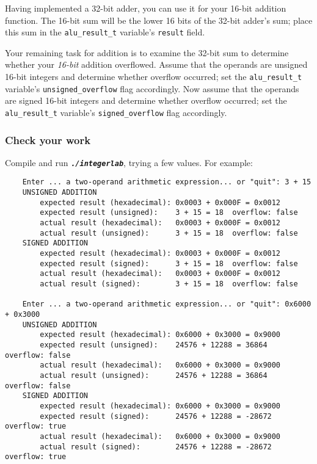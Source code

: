 Having implemented a 32-bit adder, you can use it for your 16-bit addition function.
The 16-bit sum will be the lower 16 bits of the 32-bit adder's sum;
place this sum in the \lstinline{alu_result_t} variable's \lstinline{result} field.

Your remaining task for addition is to examine the 32-bit sum to determine whether your \textit{16-bit} addition overflowed.
Assume that the operands are unsigned 16-bit integers and determine whether overflow occurred;
set the \lstinline{alu_result_t} variable's \lstinline{unsigned_overflow} flag accordingly.
Now assume that the operands are signed 16-bit integers and determine whether overflow occurred;
set the \lstinline{alu_result_t} variable's \lstinline{signed_overflow} flag accordingly.


\subsubsection*{Check your work}

Compile and run \texttt{\textbf{\textit{./integerlab}}}, trying a few values.
For example:
\begin{verbatim}
    Enter ... a two-operand arithmetic expression... or "quit": 3 + 15
    UNSIGNED ADDITION
        expected result (hexadecimal): 0x0003 + 0x000F = 0x0012
        expected result (unsigned):    3 + 15 = 18	overflow: false
        actual result (hexadecimal):   0x0003 + 0x000F = 0x0012
        actual result (unsigned):      3 + 15 = 18	overflow: false
    SIGNED ADDITION
        expected result (hexadecimal): 0x0003 + 0x000F = 0x0012
        expected result (signed):      3 + 15 = 18	overflow: false
        actual result (hexadecimal):   0x0003 + 0x000F = 0x0012
        actual result (signed):        3 + 15 = 18	overflow: false

    Enter ... a two-operand arithmetic expression... or "quit": 0x6000 + 0x3000
    UNSIGNED ADDITION
        expected result (hexadecimal): 0x6000 + 0x3000 = 0x9000
        expected result (unsigned):    24576 + 12288 = 36864	overflow: false
        actual result (hexadecimal):   0x6000 + 0x3000 = 0x9000
        actual result (unsigned):      24576 + 12288 = 36864	overflow: false
    SIGNED ADDITION
        expected result (hexadecimal): 0x6000 + 0x3000 = 0x9000
        expected result (signed):      24576 + 12288 = -28672	overflow: true
        actual result (hexadecimal):   0x6000 + 0x3000 = 0x9000
        actual result (signed):        24576 + 12288 = -28672	overflow: true
\end{verbatim}

